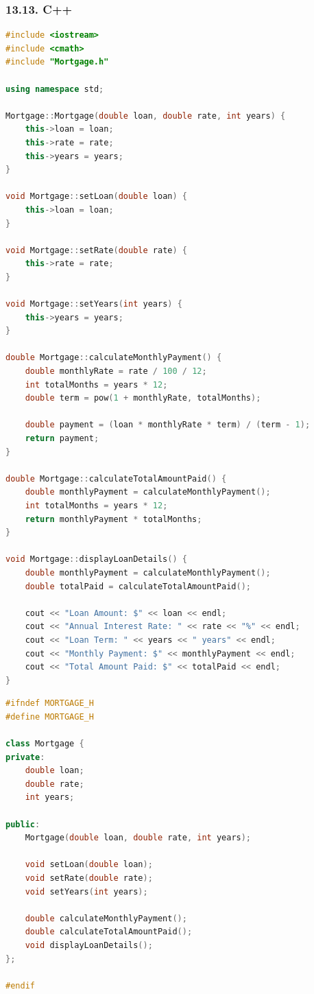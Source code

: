 \documentclass{article}
\begin{document}
\subsubsection*{13.13. C++}
\begin{lstlisting}[language=C++, caption=Mortage.cpp]
#include <iostream>
#include <cmath>
#include "Mortgage.h"

using namespace std;

Mortgage::Mortgage(double loan, double rate, int years) {
    this->loan = loan;
    this->rate = rate;
    this->years = years;
}

void Mortgage::setLoan(double loan) {
    this->loan = loan;
}

void Mortgage::setRate(double rate) {
    this->rate = rate;
}

void Mortgage::setYears(int years) {
    this->years = years;
}

double Mortgage::calculateMonthlyPayment() {
    double monthlyRate = rate / 100 / 12;
    int totalMonths = years * 12;
    double term = pow(1 + monthlyRate, totalMonths);

    double payment = (loan * monthlyRate * term) / (term - 1);
    return payment;
}

double Mortgage::calculateTotalAmountPaid() {
    double monthlyPayment = calculateMonthlyPayment();
    int totalMonths = years * 12;
    return monthlyPayment * totalMonths;
}

void Mortgage::displayLoanDetails() {
    double monthlyPayment = calculateMonthlyPayment();
    double totalPaid = calculateTotalAmountPaid();

    cout << "Loan Amount: $" << loan << endl;
    cout << "Annual Interest Rate: " << rate << "%" << endl;
    cout << "Loan Term: " << years << " years" << endl;
    cout << "Monthly Payment: $" << monthlyPayment << endl;
    cout << "Total Amount Paid: $" << totalPaid << endl;
}
\end{lstlisting}

\begin{lstlisting}[language=C++, caption=Mortage.h]
#ifndef MORTGAGE_H
#define MORTGAGE_H

class Mortgage {
private:
    double loan;
    double rate;
    int years;

public:
    Mortgage(double loan, double rate, int years);

    void setLoan(double loan);
    void setRate(double rate);
    void setYears(int years);

    double calculateMonthlyPayment();
    double calculateTotalAmountPaid();
    void displayLoanDetails();
};

#endif
\end{lstlisting}
\end{document}
